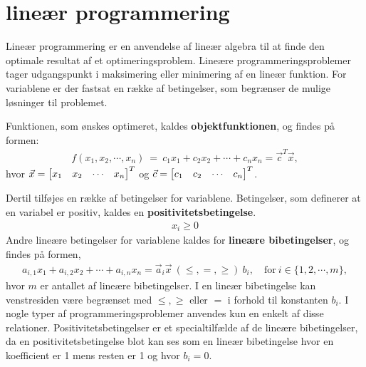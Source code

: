 \chapter{lineær programmering}

\begin{comment}
Ting til retter
- bør "def 5.5 mulige løsninger og den mulige mængde" komme før "standard maksimums- og minimumsproblemer"?
- Jeg er ikke sikker på alle termer i dette afsnit. Jeg rettede kriteriefunktion til objektfunktion, da der blev brugt objektfunktion i projektforslaget.
- Jeg er lidt inkonsistent med anvendelsen af [1 2 3] og [1,2,3]. er ikke helt sikker på hvad der ser bedst ud.
- Er der brug for at skrive betingelserne og objektfunktionen ud i starten, eller er det nok at det skrives som vektor-vektor produkt?
\end{comment}

Lineær programmering er en anvendelse af lineær algebra til at finde den optimale resultat af et optimeringsproblem. Lineære programmeringsproblemer tager udgangspunkt i maksimering eller minimering af en lineær funktion. For variablene er der fastsat en række af betingelser, som begrænser de mulige løsninger til problemet.



Funktionen, som ønskes optimeret, kaldes \textbf{objektfunktionen}, og findes på formen:
\begin{align}
f(x_1,x_2,\cdots , x_n)\ =\ c_1x_1 + c_2x_2 + \cdots + c_nx_n = \vec{c}^T \vec{x},
\end{align}
hvor $\vec{x}= \begin{bmatrix} x_1 & x_2 & \cdots & x_n \end{bmatrix}^T$ og $\vec{c}= \begin{bmatrix} c_1 & c_2 & \cdots & c_n \end{bmatrix}^T$.

Dertil tilføjes en række af betingelser for variablene. Betingelser, som definerer at en variabel er positiv, kaldes en \textbf{positivitetsbetingelse}. 
\begin{align}
	x_i \geq 0
\end{align}
Andre lineære betingelser for variablene kaldes for \textbf{lineære bibetingelser}, og findes på formen, 
\begin{align}
	a_{i,1} x_1 + a_{i,2} x_2 + \cdots + a_{i,n} x_n =\vec{a}_i\vec{x} \ (\leq,=,\geq) \  b_i, \quad \text{for} \ i \in \{1,2,\cdots, m\},
\end{align}
hvor $m$ er antallet af lineære bibetingelser. I en lineær bibetingelse kan venstresiden være begrænset med $\leq, \geq$ eller $=$ i forhold til konstanten $b_i$. I nogle typer af programmeringsproblemer anvendes kun en enkelt af disse relationer. Positivitetsbetingelser er et specialtilfælde af de lineære bibetingelser, da en positivitetsbetingelse blot kan ses som en lineær bibetingelse hvor en koefficient er 1 mens resten er 1 og hvor $b_i=0$.

